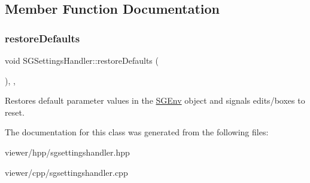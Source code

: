 \subsection{Member Function Documentation}
\mbox{\label{classSGSettingsHandler_a3d119fdf3a3f1c29e8293940613c8b3f}} 
\subsubsection{\texorpdfstring{restore\+Defaults}{restoreDefaults}}
{\footnotesize\ttfamily void S\+G\+Settings\+Handler\+::restore\+Defaults (\begin{DoxyParamCaption}{ }\end{DoxyParamCaption})\hspace{0.3cm}{\ttfamily [inline]}, {\ttfamily [private]}, {\ttfamily [slot]}}

Restores default parameter values in the \hyperlink{classSGEnv}{S\+G\+Env} object and signals edits/boxes to reset. 

The documentation for this class was generated from the following files\+:\begin{DoxyCompactItemize}
\item 
viewer/hpp/sgsettingshandler.\+hpp\item 
viewer/cpp/sgsettingshandler.\+cpp\end{DoxyCompactItemize}
